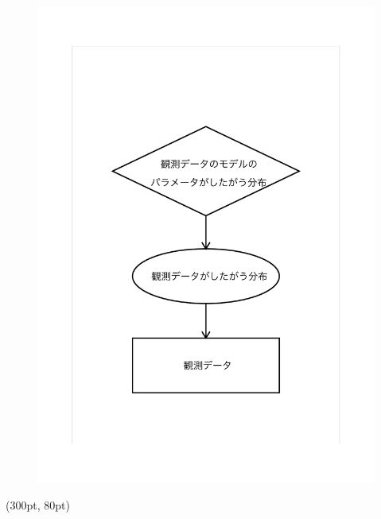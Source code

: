 \documentclass[aspectratio=169,unicode,dvipdfmx,14pt]{beamer}
\begin{document}
\begin{frame}
\begin{figure}[htbp]
\begin{center}
\vspace{-1.1in}
\includegraphics[scale=0.45]{Nebo_figures.nebo_Page_1.pdf}
\end{center}
\end{figure}
\begin{textblock*}{0.4\linewidth}(300pt, 80pt)
    \centering

\end{textblock*}
\end{frame}
\end{document}
